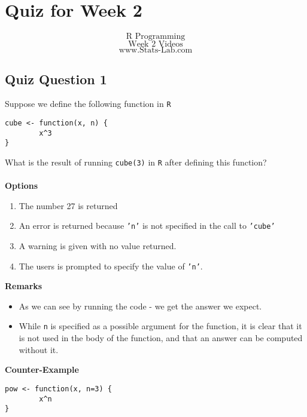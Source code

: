 \documentclass[12pt]{article}
\begin{document}
\tableofcontents
\newpage
\large
\section*{Quiz for Week 2}
\newpage

{
	\Huge
\[\mbox{R Programming} \]
\[ \mbox{Week 2 Videos} \]
\huge
\bigskip
\[ \mbox{www.Stats-Lab.com} \]
}

\newpage

\subsection*{Quiz Question 1}%
Suppose we define the following function in \texttt{R}
\begin{framed}
\begin{verbatim}
cube <- function(x, n) {
        x^3
}
\end{verbatim}
\end{framed}
\noindent What is the result of running
\texttt{cube(3)}
in \texttt{R} after defining this function?\\ \\
\textbf{Options}
\begin{enumerate}
\item The number 27 is returned
\item An error is returned because \texttt{'n'} is not specified in the call to \texttt{'cube'}
\item A warning is given with no value returned.
\item The users is prompted to specify the value of \texttt{'n'}.
\end{enumerate}
\bigskip
\textbf{Remarks}
\begin{itemize}
\item As we can see by running the code - we get the answer we expect.
\item While \texttt{n} is specified as a possible argument for the function, it is clear that it is not used in the body of the function, and that an answer can be computed without it.
\end{itemize}
\newpage

\textbf{Counter-Example}
\begin{framed}
\begin{verbatim}
pow <- function(x, n=3) {
        x^n
}
\end{verbatim}
\end{framed}

\newpage
\end{document}
